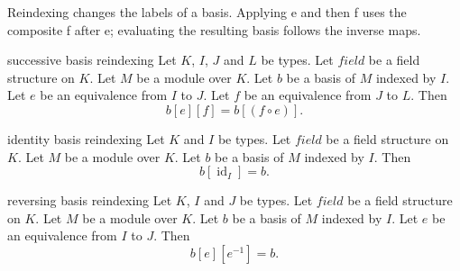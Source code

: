 Reindexing changes the labels of a basis. Applying e and then f uses the
composite f after e; evaluating the resulting basis follows the inverse maps.
\par

\begin{cleanresult}{successive basis reindexing}
Let $K$, $I$, $J$ and $L$ be types.
Let $\mathit{field}$ be a field structure on $K$.
Let $M$ be a module over $K$.
Let $b$ be a basis of $M$ indexed by $I$.
Let $e$ be an equivalence from $I$ to $J$.
Let $f$ be an equivalence from $J$ to $L$.
Then \[b[e][f]=b[\left(f\circ e\right)].\]
\par{}
\end{cleanresult}

\begin{cleanresult}{identity basis reindexing}
Let $K$ and $I$ be types.
Let $\mathit{field}$ be a field structure on $K$.
Let $M$ be a module over $K$.
Let $b$ be a basis of $M$ indexed by $I$.
Then \[b[\operatorname{id}_{I}]=b.\]
\par{}
\end{cleanresult}

\begin{cleanresult}{reversing basis reindexing}
Let $K$, $I$ and $J$ be types.
Let $\mathit{field}$ be a field structure on $K$.
Let $M$ be a module over $K$.
Let $b$ be a basis of $M$ indexed by $I$.
Let $e$ be an equivalence from $I$ to $J$.
Then \[b[e][e^{-1}]=b.\]
\par{}
\end{cleanresult}

